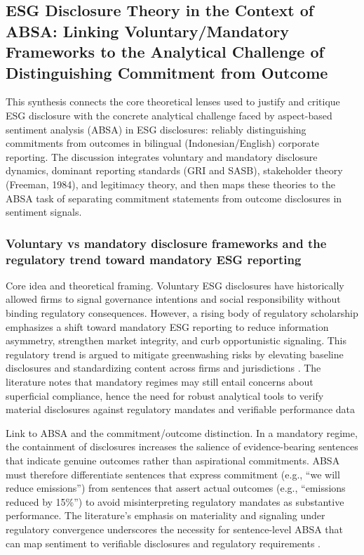 \subsection{ESG Disclosure Theory in the Context of ABSA: Linking Voluntary/Mandatory Frameworks to the Analytical Challenge of Distinguishing Commitment from Outcome}

This synthesis connects the core theoretical lenses used to justify and critique ESG disclosure with the concrete analytical challenge faced by aspect-based sentiment analysis (ABSA) in ESG disclosures: reliably distinguishing commitments from outcomes in bilingual (Indonesian/English) corporate reporting. The discussion integrates voluntary and mandatory disclosure dynamics, dominant reporting standards (GRI and SASB), stakeholder theory (Freeman, 1984), and legitimacy theory, and then maps these theories to the ABSA task of separating commitment statements from outcome disclosures in sentiment signals.

\subsubsection{Voluntary vs mandatory disclosure frameworks and the regulatory trend toward mandatory ESG reporting}

Core idea and theoretical framing. Voluntary ESG disclosures have historically allowed firms to signal governance intentions and social responsibility without binding regulatory consequences. However, a rising body of regulatory scholarship emphasizes a shift toward mandatory ESG reporting to reduce information asymmetry, strengthen market integrity, and curb opportunistic signaling. This regulatory trend is argued to mitigate greenwashing risks by elevating baseline disclosures and standardizing content across firms and jurisdictions \cite{10.1002/bse.2657,10.1145/3322905.3322909,10.1002/bsd2.244,10.1145/3167132.3167236}. The literature notes that mandatory regimes may still entail concerns about superficial compliance, hence the need for robust analytical tools to verify material disclosures against regulatory mandates and verifiable performance data \cite{10.1002/bsd2.70172,10.3390/jrfm17080326,10.2139/ssrn.5130854}

Link to ABSA and the commitment/outcome distinction. In a mandatory regime, the containment of disclosures increases the salience of evidence-bearing sentences that indicate genuine outcomes rather than aspirational commitments. ABSA must therefore differentiate sentences that express commitment (e.g., “we will reduce emissions”) from sentences that assert actual outcomes (e.g., “emissions reduced by 15\%”) to avoid misinterpreting regulatory mandates as substantive performance. The literature’s emphasis on materiality and signaling under regulatory convergence underscores the necessity for sentence-level ABSA that can map sentiment to verifiable disclosures and regulatory requirements \cite{10.1002/bsd2.70172,10.1108/sampj-04-2023-0227,10.3390/su15065508,10.60079/aaar.v2i1.166,10.1108/medar-11-2021-1486} .

